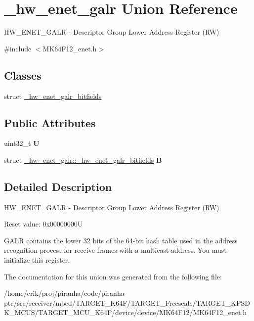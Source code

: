 \hypertarget{union__hw__enet__galr}{}\section{\+\_\+hw\+\_\+enet\+\_\+galr Union Reference}
\label{union__hw__enet__galr}


H\+W\+\_\+\+E\+N\+E\+T\+\_\+\+G\+A\+LR -\/ Descriptor Group Lower Address Register (RW)  




{\ttfamily \#include $<$M\+K64\+F12\+\_\+enet.\+h$>$}

\subsection*{Classes}
\begin{DoxyCompactItemize}
\item 
struct \hyperlink{struct__hw__enet__galr_1_1__hw__enet__galr__bitfields}{\+\_\+hw\+\_\+enet\+\_\+galr\+\_\+bitfields}
\end{DoxyCompactItemize}
\subsection*{Public Attributes}
\begin{DoxyCompactItemize}
\item 
uint32\+\_\+t {\bfseries U}\hypertarget{union__hw__enet__galr_a4e28e16fc5a2a47d9694703879366a10}{}\label{union__hw__enet__galr_a4e28e16fc5a2a47d9694703879366a10}

\item 
struct \hyperlink{struct__hw__enet__galr_1_1__hw__enet__galr__bitfields}{\+\_\+hw\+\_\+enet\+\_\+galr\+::\+\_\+hw\+\_\+enet\+\_\+galr\+\_\+bitfields} {\bfseries B}\hypertarget{union__hw__enet__galr_a80ef91263281c8f6fab90fa4baba7c68}{}\label{union__hw__enet__galr_a80ef91263281c8f6fab90fa4baba7c68}

\end{DoxyCompactItemize}


\subsection{Detailed Description}
H\+W\+\_\+\+E\+N\+E\+T\+\_\+\+G\+A\+LR -\/ Descriptor Group Lower Address Register (RW) 

Reset value\+: 0x00000000U

G\+A\+LR contains the lower 32 bits of the 64-\/bit hash table used in the address recognition process for receive frames with a multicast address. You must initialize this register. 

The documentation for this union was generated from the following file\+:\begin{DoxyCompactItemize}
\item 
/home/erik/proj/piranha/code/piranha-\/ptc/src/receiver/mbed/\+T\+A\+R\+G\+E\+T\+\_\+\+K64\+F/\+T\+A\+R\+G\+E\+T\+\_\+\+Freescale/\+T\+A\+R\+G\+E\+T\+\_\+\+K\+P\+S\+D\+K\+\_\+\+M\+C\+U\+S/\+T\+A\+R\+G\+E\+T\+\_\+\+M\+C\+U\+\_\+\+K64\+F/device/device/\+M\+K64\+F12/M\+K64\+F12\+\_\+enet.\+h\end{DoxyCompactItemize}
